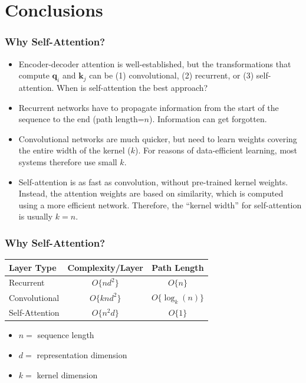 \documentclass{beamer}
\begin{document}
\section[Conclusion]{Conclusions}
\setcounter{subsection}{1}

\begin{frame}
  \frametitle{Why Self-Attention?}

  \begin{itemize}
    \item 
      Encoder-decoder attention is well-established, but the
      transformations that compute $\bm{q}_i$ and $\bm{k}_j$ can be (1) convolutional,
      (2) recurrent, or (3) self-attention.  When is self-attention the
      best approach?
    \item
      Recurrent networks have to propagate information from the start
      of the sequence to the end (path length=$n$).  Information can
      get forgotten.
    \item
      Convolutional networks are much quicker, but need to learn
      weights covering the entire width of the kernel ($k$).  For
      reasons of data-efficient learning, most systems therefore use
      small $k$.
    \item
      Self-attention is as fast as convolution, without pre-trained
      kernel weights.  Instead, the attention weights are based on
      similarity, which is computed using a more efficient network.
      Therefore, the ``kernel width'' for self-attention is usually
      $k=n$.
  \end{itemize}
\end{frame}


\begin{frame}
  \frametitle{Why Self-Attention?}

  \begin{center}
    \begin{tabular}{lcc}\hline
      Layer Type & Complexity/Layer & Path Length \\\hline
      Recurrent & $O\{nd^2\}$ & $O\{n\}$ \\ 
      Convolutional & $O\{knd^2\}$ & $O\{\log_k(n)\}$ \\ 
      Self-Attention & $O\{n^2d\}$ & $O\{1\}$ \\\hline
    \end{tabular}
  \end{center}
  \begin{itemize}
  \item $n=$ sequence length
  \item $d=$ representation dimension
  \item $k=$ kernel dimension
  \end{itemize}
\end{frame}
\end{document}
